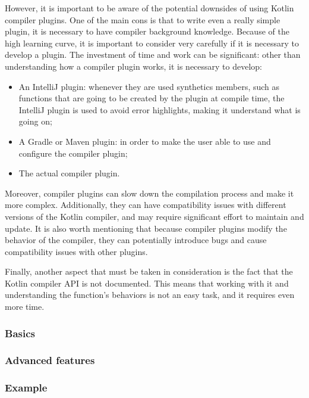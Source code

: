 However, it is important to be aware of the potential downsides of using Kotlin compiler plugins. One of the main cons is that to write even a really simple plugin, it is necessary to have compiler background knowledge. Because of the high learning curve, it is important to consider very carefully if it is necessary to develop a plugin. The investment of time and work can be significant: other than understanding how a compiler plugin works, it is necessary to develop:
\begin{itemize}
    \item An IntelliJ plugin: whenever they are used synthetics members, such as functions that are going to be created by the plugin at compile time, the IntelliJ plugin is used to avoid error highlights, making it understand what is going on;
    \item A Gradle or Maven plugin: in order to make the user able to use and configure the compiler plugin;
    \item The actual compiler plugin.
\end{itemize}

Moreover, compiler plugins can slow down the compilation process and make it more complex. Additionally, they can have compatibility issues with different versions of the Kotlin compiler, and may require significant effort to maintain and update. It is also worth mentioning that because compiler plugins modify the behavior of the compiler, they can potentially introduce bugs and cause compatibility issues with other plugins.

Finally, another aspect that must be taken in consideration is the fact that the Kotlin compiler API is not documented. This means that working with it and understanding the function's behaviors is not an easy task, and it requires even more time.

\subsubsection{Basics}
\subsubsection{Advanced features}
\subsubsection{Example}
